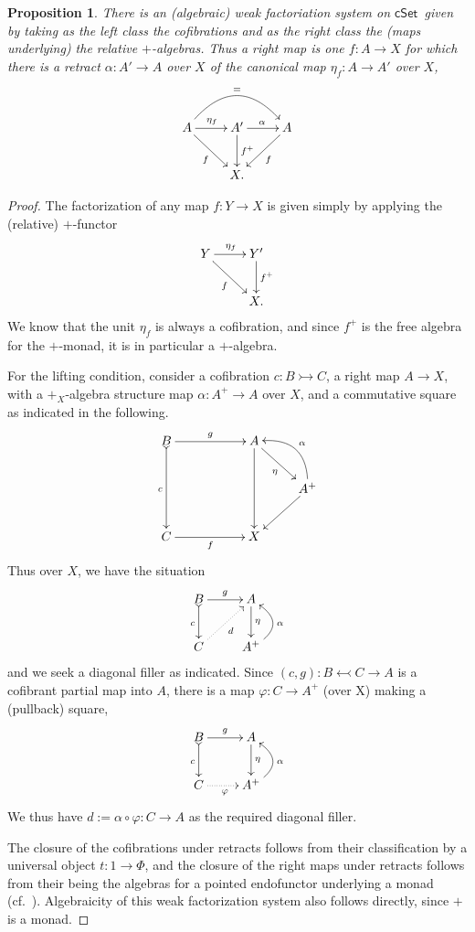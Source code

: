 \documentclass[11pt]{article}
\newcommand{\cSet}{\ensuremath{\mathsf{cSet}}}
\newcommand{\mono}{\ensuremath{\rightarrowtail}}
\newtheorem{proposition}[theorem]{Proposition}
\theoremstyle{remark}
\theoremstyle{definition}
\begin{document}
\begin{proposition}
There is an (algebraic) weak factoriation system on \cSet\ given by taking as the left class the cofibrations and as the right class the (maps underlying) the relative $+$-algebras. Thus a right map is one $f :A\to X$ for which there is a retract $\alpha : A'\to A$ over $X$ of the canonical map $\eta_f : A\to A'$ over $X$,
\[
\xymatrix{
A\ar[rd]_{f} \ar[r]^{\eta_f} \ar@/^6ex/ [rr]^= & A' \ar[r]^{\alpha} \ar[d]^-{f^+} & \ar[ld]^{f} A \\
& X. &
}
\]
\end{proposition}
\begin{proof}
The factorization of any map $f : Y\to X$ is given simply by applying the (relative) $+$-functor
\[
\xymatrix{
Y\ar[rd]_{f} \ar[r]^{\eta_f} & Y' \ar[d]^-{f^+} \\
& X. 
}
\]
We know that the unit $\eta_f$ is always a cofibration, and since $f^+$ is the free algebra for the $+$-monad, it is in particular a $+$-algebra.

For the lifting condition, consider a cofibration $c : B\mono C$, a right map $A\to X$, with a $+_X$-algebra structure map $\alpha: A^+ \to A$ over $X$, and a commutative square as indicated in the following.
\[
\xymatrix{
B \ar@{>->}[dd]_{c} \ar[rr]^{g}  && A \ar[dd] \ar[rd]_{\eta} & \\
 &&& A^+ \ar@/_4ex/ [lu]_\alpha  \ar[ld] \\
C \ar[rr]_{f} && X &
}
\]
Thus over $X$, we have the situation
\[
\xymatrix{
B\ar@{>->}[d]_{c} \ar[r]^{g} & A \ar[d]^-{\eta} \\
C \ar@{.>}[ru]_{d} & A^+ \ar@/_4ex/ [u]_\alpha
}
\]
and we seek a diagonal filler as indicated.
Since $(c,g) : B \leftarrowtail C \to A$ is a cofibrant partial map into $A$, there is a map $\varphi : C \to A^+$ (over X) making a (pullback) square,
\[
\xymatrix{
B\ar@{>->}[d]_{c} \ar[r]^{g} & A \ar[d]^-{\eta} \\
C \ar@{.>}[r]_{\varphi} & A^+ \ar@/_4ex/ [u]_\alpha
}
\]
We thus have $d := \alpha\circ \varphi : C \to A$ as the required diagonal filler.

The closure of the cofibrations under retracts follows from their classification by a universal object $t : 1 \to \Phi$, and the closure of the right maps under retracts follows from their being the algebras for a pointed endofunctor underlying a monad (cf.~\cite{RV}).  Algebraicity of this weak factorization system also follows directly, since $+$ is a monad.
\end{proof}
\end{document}
